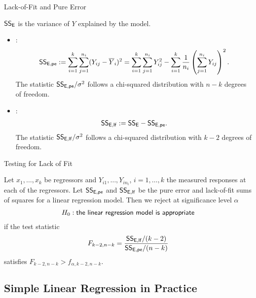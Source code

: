 \begin{frame}{Lack-of-Fit and Pure Error}

\justifying
{} $\mathsf{SS_E}$ is the variance of $Y$ explained by the model.
\begin{itemize}
	\justifying
	\item {}:
	\footnotesize
	\begin{align*}
	\mathsf{SS_{E,pe}} := \sum_{i=1}^k \sum_{j=1}^{n_i} (Y_{ij}-\overline{Y}_i)^2 = \sum_{i=1}^k\sum_{j=1}^{n_i} Y_{ij}^2 - \sum_{i=1}^k \frac{1}{n_i}\left(\sum_{j=1}^{n_i} Y_{ij} \right)^2.
	\end{align*}
	\normalsize
	The statistic $\mathsf{SS_{E,pe}}/\sigma^2$ follows a chi-squared distribution with $n-k$ degrees of freedom.
	\item {}:
	\footnotesize
	\begin{align*}
	\mathsf{SS_{E,lf}} := \mathsf{SS_E} - \mathsf{SS_{E,pe}}.
	\end{align*}
	\normalsize
	The statistic $\mathsf{SS_{E,lf}}/\sigma^2$ follows a chi-squared distribution with $k-2$ degrees of freedom.
\end{itemize}


\end{frame}


\begin{frame}{Testing for Lack of Fit}

\justifying
{} Let $x_1, \ldots, x_k$ be regressors and $Y_{i1}, \ldots, Y_{in_i}$, $i = 1, \ldots, k$ the measured responses at each of the regressors. Let $\mathsf{SS_{E,pe}}$ and $\mathsf{SS_{E,lf}}$ be the pure error and lack-of-fit sums of squares for a linear regression model. Then we reject at significance level $\alpha$
\begin{align*}
H_0: \mathsf{the\ linear\ regression\ model\ is\ appropriate}
\end{align*}
if the test statistic
\begin{align*}
F_{k-2,n-k} = \frac{\mathsf{SS_{E,lf}}/(k-2)}{\mathsf{SS_{E,pe}}/(n-k)}
\end{align*}
satisfies $F_{k-2,n-k} > f_{\alpha,k-2,n-k}$.

\end{frame}



\subsection{Simple Linear Regression in Practice}



